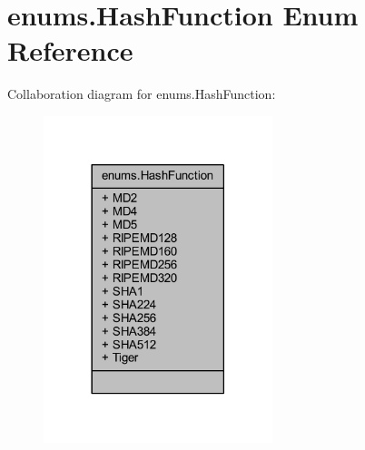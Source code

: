 \hypertarget{enumenums_1_1_hash_function}{}\section{enums.\+Hash\+Function Enum Reference}
\label{enumenums_1_1_hash_function}


Collaboration diagram for enums.\+Hash\+Function\+:\nopagebreak
\begin{figure}[H]
\begin{center}
\leavevmode
\includegraphics[width=189pt]{enumenums_1_1_hash_function__coll__graph}
\end{center}
\end{figure}
